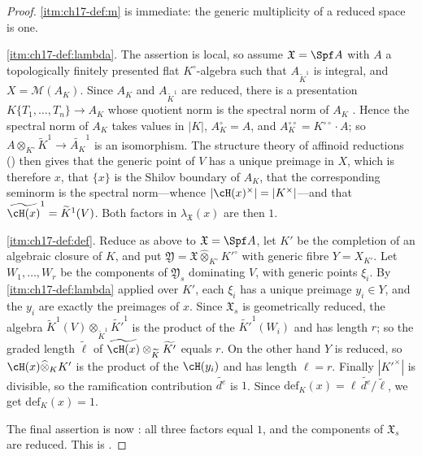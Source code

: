 \begin{proof}
\cref{itm:ch17-def:m} is immediate: the generic multiplicity of a reduced
space is one.

\cref{itm:ch17-def:lambda}.  The assertion is local, so assume
$\mathfrak X=\Spf A$ with $A$ a topologically finitely presented flat
$K^\circ$-algebra such that $A_{\widetilde K^1}$ is integral, and
$X=\mathcal M(A_K)$.  Since $A_K$ and $A_{\widetilde K^1}$ are
reduced, there is a presentation $K\{T_1,\dots,T_n\}\to A_K$ whose
quotient norm is the spectral norm of $A_K$
\cite[Proposition~1.1]{BoschLutkebohmert1993}.  Hence the spectral norm of
$A_K$ takes values in $|K|$, $A_K^\circ=A$, and
$A_K^{\circ\circ}=K^{\circ\circ}\cdot A$; so
$A\otimes_{K^\circ}\widetilde K^1\to\widetilde{A_K}^1$ is an isomorphism.
The structure theory of affinoid reductions
() then gives that the generic point of $V$ has a
unique preimage in $X$, which is therefore $x$, that $\{x\}$ is the
Shilov boundary of $A_K$, that the corresponding seminorm is the spectral
norm---whence $|\cH(x)^\times|=|K^\times|$---and that
$\widetilde{\cH(x)}^1=\widetilde K^1(V)$.  Both factors in
$\lambda_{\mathfrak X}(x)$ are then $1$.

\cref{itm:ch17-def:def}.  Reduce as above to $\mathfrak X=\Spf A$, let
$K'$ be the completion of an algebraic closure of $K$, and put
$\mathfrak Y=\mathfrak X\widehat\otimes_{K^\circ}K'^\circ$ with generic
fibre $Y=X_{K'}$.  Let $W_1,\dots,W_r$ be the components of
$\mathfrak Y_s$ dominating $V$, with generic points $\xi_i$.  By
\cref{itm:ch17-def:lambda} applied over $K'$, each $\xi_i$ has a unique
preimage $y_i\in Y$, and the $y_i$ are exactly the preimages of $x$.
Since $\mathfrak X_s$ is geometrically reduced, the algebra
$\widetilde K^1(V)\otimes_{\widetilde K^1}\widetilde{K'}^1$ is the product
of the $\widetilde{K'}^1(W_i)$ and has length $r$; so the graded length
$\widetilde\ell$ of
$\widetilde{\cH(x)}\otimes_{\widetilde K}\widetilde{K'}$ equals $r$.
On the other hand $Y$ is reduced, so $\cH(x)\widehat\otimes_KK'$ is the
product of the $\cH(y_i)$ and has length $\ell=r$.  Finally
$|K'^\times|$ is divisible, so the ramification contribution
$\widetilde{d^e}$ is $1$.  Since
$\mathrm{def}_K(x)=\ell\,\widetilde{d^e}/\widetilde\ell$, we get
$\mathrm{def}_K(x)=1$.

The final assertion is now : all three factors equal
$1$, and the components of $\mathfrak X_s$ are reduced.  This is
\cite[Proposition~18.5.6 and Corollary~18.5.7]{CLD25}.
\end{proof}

